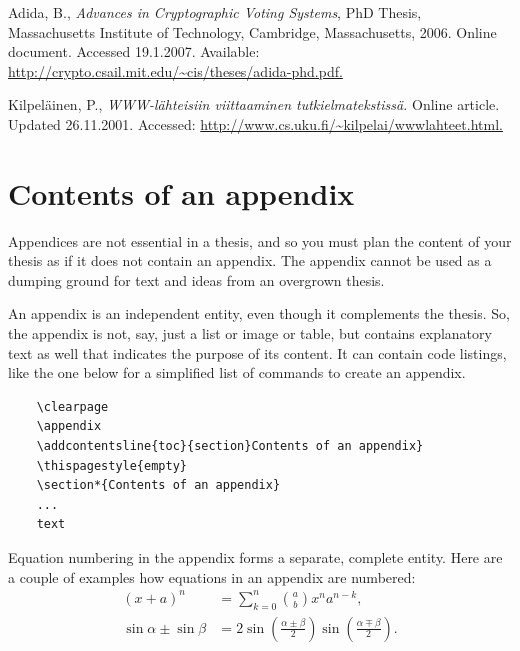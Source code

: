 \documentclass[english, 12pt, a4paper, biz, utf8, a-2b, online]{aaltothesis}
\begin{document}
\begin{thebibliography}{99}
   Adida, B., \textit{Advances in Cryptographic Voting Systems}, 
	PhD Thesis, Massachusetts Institute of Technology, Cambridge, Massachusetts,
	2006. Online document. Accessed 19.1.2007. Available: 
	\url{http://crypto.csail.mit.edu/~cis/theses/adida-phd.pdf.}

   Kilpeläinen, P., 
    \textit{\foreignlanguage{finnish}{WWW-lähteisiin viittaaminen 
    		tutkielmatekstissä}.} Online article. Updated 26.11.2001. 
	Accessed: \url{http://www.cs.uku.fi/~kilpelai/wwwlahteet.html.}

\end{thebibliography}

\clearpage

\thesisappendix

\section{Contents of an appendix}
\label{app:contents}

Appendices are not essential in a thesis, and so you must plan the content of 
your thesis as if it does not contain an appendix. The appendix cannot be used 
as a dumping ground for text and ideas from an overgrown thesis.

An appendix is an independent entity, even though it complements the thesis. 
So, the appendix is not, say, just a list or image or table, but contains 
explanatory text as well that indicates the purpose of its content. It can 
contain code listings, like the one below for a simplified list of commands to 
create an appendix.
\begin{verbatim}
	\clearpage
	\appendix
	\addcontentsline{toc}{section}Contents of an appendix}
	\thispagestyle{empty}
	\section*{Contents of an appendix}
	...
	text
\end{verbatim}

Equation numbering in the appendix forms a separate, complete entity. Here are a couple of examples how equations in an appendix are numbered:
\begin{align}
	(x+a)^n &= \sum_{k=0}^n \binom{a}{b} x^n a^{n-k}, \label{appeq:1}\\
	\sin\alpha \pm \sin\beta &= 2\sin\left(\frac{\alpha\pm\beta}{2}\right)
	\sin\left(\frac{\alpha\mp\beta}{2}\right). \label{liitekaava2}
\end{align}
\end{document}
